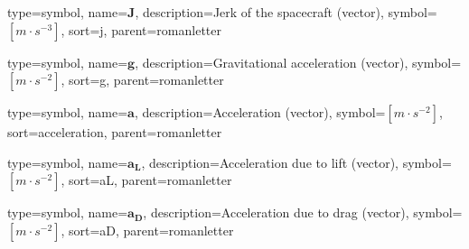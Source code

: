 {
type=symbol, %
name={\ensuremath{\mathbf{J}}}, %
description={Jerk of the spacecraft (vector)}, %
symbol={$\left[m\cdot s^{-3}\right]$}, %
sort=j, %
parent=romanletter %
}

{
type=symbol, %
name={\ensuremath{\mathbf{g}}}, %
description={Gravitational acceleration (vector)}, %
symbol={$\left[m\cdot s^{-2}\right]$}, %
sort=g, %
parent=romanletter %
}

{
type=symbol, %
name={\ensuremath{\mathbf{a}}}, %
description={Acceleration (vector)}, %
symbol={$\left[m\cdot s^{-2}\right]$}, %
sort=acceleration, %
parent=romanletter %
}

{
type=symbol, %
name={\ensuremath{\mathbf{a_L}}}, %
description={Acceleration due to lift (vector)}, %
symbol={$\left[m\cdot s^{-2}\right]$}, %
sort=aL, %
parent=romanletter %
}

{
type=symbol, %
name={\ensuremath{\mathbf{a_D}}}, %
description={Acceleration due to drag (vector)}, %
symbol={$\left[m\cdot s^{-2}\right]$}, %
sort=aD, %
parent=romanletter %
}

